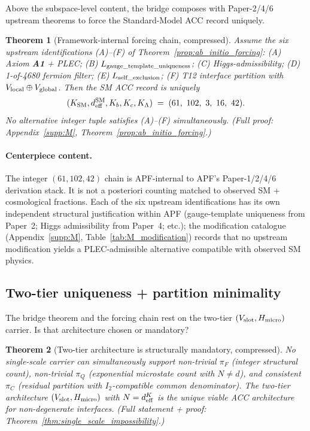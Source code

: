 \documentclass[11pt]{article}
\theoremstyle{plain}
\newtheorem{theorem}{Theorem}[section]
\theoremstyle{definition}
\theoremstyle{remark}
\newcommand{\Aone}{\textbf{A1}}
\begin{document}
Above the subspace-level content, the bridge composes with Paper-2/4/6 upstream theorems to force the Standard-Model ACC record uniquely.

\begin{theorem}[Framework-internal forcing chain, compressed]\label{thm:O_forcing_chain}
Assume the six upstream identifications (A)--(F) of Theorem~\ref{prop:ab_initio_forcing}: (A) Axiom \Aone{} + PLEC; (B) $L_{\rm gauge\_template\_uniqueness}$; (C) Higgs-admissibility; (D) 1-of-4680 fermion filter; (E) $L_{\rm self\_exclusion}$; (F) T12 interface partition with $V_{\rm local} \oplus V_{\rm global}$.  Then the SM ACC record is uniquely
\[
  (K_{\rm SM}, d_{\rm eff}^{\rm SM}, K_b, K_c, K_\Lambda) \;=\; (61,\ 102,\ 3,\ 16,\ 42).
\]
No alternative integer tuple satisfies (A)--(F) simultaneously.  (Full proof: Appendix~\ref{supp:M}, Theorem~\ref{prop:ab_initio_forcing}.)
\end{theorem}

\paragraph{Centerpiece content.}  The integer $(61, 102, 42)$ chain is APF-internal to APF's Paper-1/2/4/6 derivation stack.  It is not a posteriori counting matched to observed SM + cosmological fractions.  Each of the six upstream identifications has its own independent structural justification within APF (gauge-template uniqueness from Paper~2; Higgs admissibility from Paper~4; etc.); the modification catalogue (Appendix~\ref{supp:M}, Table~\ref{tab:M_modification}) records that no upstream modification yields a PLEC-admissible alternative compatible with observed SM physics.

\bigskip

\subsection{Two-tier uniqueness + partition minimality}\label{supp:O_twotier}

The bridge theorem and the forcing chain rest on the two-tier $(V_{\rm slot}, H_{\rm micro})$ carrier.  Is that architecture chosen or mandatory?

\begin{theorem}[Two-tier architecture is structurally mandatory, compressed]\label{thm:O_twotier}
No single-scale carrier can simultaneously support non-trivial $\pi_F$ (integer structural count), non-trivial $\pi_Q$ (exponential microstate count with $N \neq d$), and consistent $\pi_C$ (residual partition with $I_2$-compatible common denominator).  The two-tier architecture $(V_{\rm slot}, H_{\rm micro})$ with $N = d_{\rm eff}^K$ is the unique viable ACC architecture for non-degenerate interfaces.  (Full statement + proof: Theorem~\ref{thm:single_scale_impossibility}.)
\end{theorem}
\end{document}
